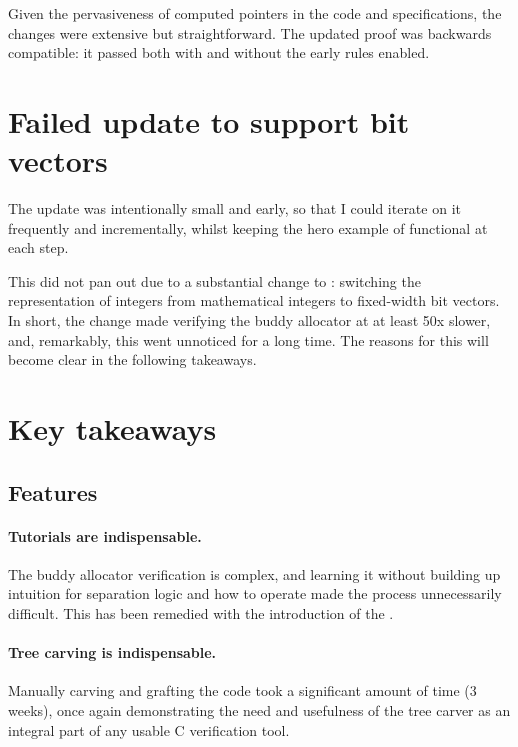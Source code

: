 Given the pervasiveness of computed pointers in the code and specifications,
the changes were extensive but straightforward. The updated proof was backwards
compatible: it passed both with and without the early  rules enabled.

\section{Failed update to support bit vectors}\label{sec:buddy-failed-bv}

The  update was intentionally small and early, so that I could iterate
on it frequently and incrementally, whilst keeping the hero example of 
functional at each step.

This did not pan out due to a substantial change to : switching the
representation of integers from mathematical integers to fixed-width bit
vectors. In short, the change made verifying the buddy allocator at at least
50x slower, and, remarkably, this went unnoticed for a long time. The reasons
for this will become clear in the following takeaways.

\section{Key takeaways}


\subsection{Features}\label{subesc:takeaway-features}

\paragraph{Tutorials are indispensable.} The buddy allocator verification is
complex, and learning it without building up intuition for separation logic and
how to operate  made the process unnecessarily difficult. This has been
remedied with the introduction of the .

\paragraph{Tree carving is indispensable.} Manually carving and grafting the
code took a significant amount of time (3 weeks), once again demonstrating the
need and usefulness of the tree carver as an integral part of any usable C
verification tool.

